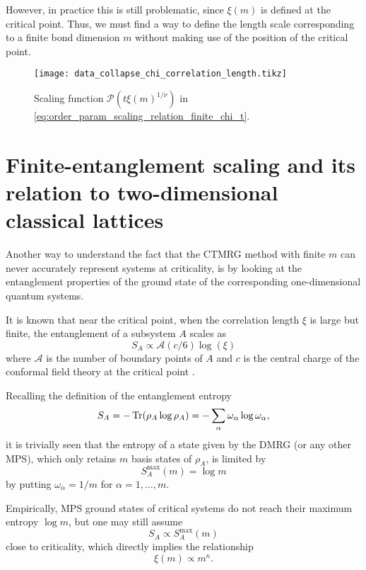 However, in practice this is still problematic, since $\xi(m)$ is defined at the critical point. Thus, we must find a
way to define the length scale corresponding to a finite bond dimension $m$ without making use of the position of the
critical point.

\begin{figure}
  \texttt{[image: data\_collapse\_chi\_correlation\_length.tikz]}
  \caption{Scaling function $\mathcal{P}(t \xi(m)^{1/\nu})$ in
  \autoref{eq:order_param_scaling_relation_finite_chi_t}.}\label{fig:data_collapse_chi_correlation_length}
\end{figure}

\section{Finite-entanglement scaling and its relation to two-dimensional classical lattices}

Another way to understand the fact that the CTMRG method with finite $m$ can never accurately represent systems at
criticality, is by looking at the entanglement properties of the ground state of the corresponding one-dimensional
quantum systems.

It is known that near the critical point, when the correlation length $\xi$ is large but finite, the entanglement of a
subsystem $A$ scales as
\begin{equation}
  S_A \propto \mathcal{A}(c/6)\log(\xi)
\end{equation}
where $\mathcal{A}$ is the number of boundary points of $A$ and $c$ is the central charge of the conformal field theory
at the critical point \cite{calabrese2004entanglement, vidal2003entanglement, ercolessi2010exact}.

Recalling the definition of the entanglement entropy
\begin{equation}
  S_A = - \operatorname{Tr}(\rho_A \log \rho_A) = - \sum_{\alpha} \omega_{\alpha} \log \omega_{\alpha},
\end{equation}
it is trivially seen that the entropy of a state given by the DMRG (or any other MPS), which only
retains $m$ basis states of $\rho_A$, is limited by
\begin{equation}
  S^{\text{max}}_A(m) = \log m
\end{equation}
by putting $\omega_{\alpha} = 1/m$ for $\alpha = 1, \dots, m$.

Empirically, MPS ground states of critical systems do not reach their maximum entropy $\log m$, but one may still assume
\begin{equation}
  S_A \propto S^{\text{max}}_A(m)
\end{equation}
close to criticality, which directly implies the relationship
\begin{equation}\label{eq:xi_propto_kappa}
  \xi(m) \propto m^{\kappa}.
\end{equation}

